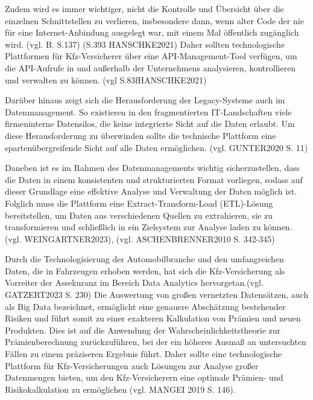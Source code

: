 Zudem wird es immer wichtiger, nicht die Kontrolle und Übersicht über die einzelnen Schnittstellen zu verlieren, insbesondere dann, wenn alter Code der nie für eine Internet-Anbindung ausgelegt war, mit einem Mal öffentlich zugänglich wird. (vgl. B. S.137) (S.393 HANSCHKE2021) Daher sollten technologische Plattformen für Kfz-Versicherer über eine API-Management-Tool verfügen, um die API-Aufrufe in und außerhalb der Unternehmens analysieren, kontrollieren und verwalten zu können. (vgl S.83fHANSCHKE2021)

Darüber hinaus zeigt sich die Herausforderung der Legacy-Systeme auch im Datenmanagement. So existieren in den fragmentierten IT-Landschaften viele firmeninterne Datensilos, die keine integrierte Sicht auf die Daten erlaubt. Um diese Herausforderung zu überwinden sollte die technische Plattform eine spartenübergreifende Sicht auf alle Daten ermöglichen. (vgl. GUNTER2020 S. 11)

Daneben ist es im Rahmen des Datenmanagements wichtig sicherzustellen, dass die Daten in einem konsistenten und strukturierten Format vorliegen, sodass auf dieser Grundlage eine effektive Analyse und Verwaltung der Daten möglich ist. Folglich muss die Plattform eine Extract-Transform-Load (ETL)-Lösung bereitstellen, um Daten aus verschiedenen Quellen zu extrahieren, sie zu transformieren und schließlich in ein Zielsystem zur Analyse laden zu können. (vgl. WEINGARTNER2023), (vgl. ASCHENBRENNER2010 S. 342-345)

Durch die Technologisierung der Automobilbranche und den umfangreichen Daten, die in Fahrzeugen erhoben werden, hat sich die Kfz-Versicherung als Vorreiter der Assekuranz im Bereich Data Analytics hervorgetan.(vgl. GATZERT2023 S. 230) Die Auswertung von großen vernetzten Datensätzen, auch als Big Data bezeichnet, ermöglicht eine genauere Abschätzung bestehender Risiken und führt somit zu einer exakteren Kalkulation von Prämien und neuen Produkten. Dies ist auf die Anwendung der Wahrscheinlichkeitstheorie zur Prämienberechnung zurückzuführen, bei der ein höheres Ausmaß an untersuchten Fällen zu einem präziseren Ergebnis führt. Daher sollte eine technologische Plattform für Kfz-Versicherungen auch Lösungen zur Analyse großer Datenmengen bieten, um den Kfz-Versicherern eine optimale Prämien- und Risikokalkulation zu ermöglichen (vgl. MANGEI 2019 S. 146).

